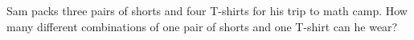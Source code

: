 Sam packs three pairs of shorts and four T-shirts for his trip to math camp. How many different combinations of one pair of shorts and one T-shirt can he wear?
